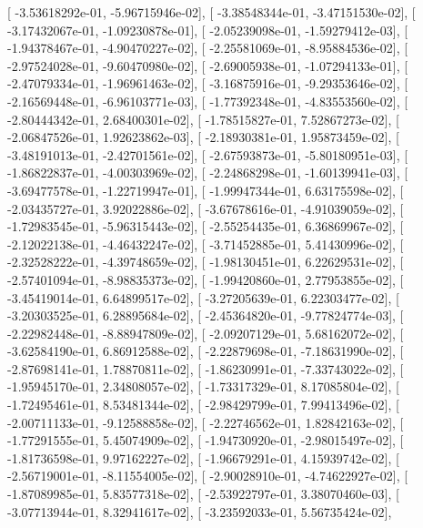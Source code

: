 \documentclass{article}
\begin{document}
       [ -3.53618292e-01,  -5.96715946e-02],
       [ -3.38548344e-01,  -3.47151530e-02],
       [ -3.17432067e-01,  -1.09230878e-01],
       [ -2.05239098e-01,  -1.59279412e-03],
       [ -1.94378467e-01,  -4.90470227e-02],
       [ -2.25581069e-01,  -8.95884536e-02],
       [ -2.97524028e-01,  -9.60470980e-02],
       [ -2.69005938e-01,  -1.07294133e-01],
       [ -2.47079334e-01,  -1.96961463e-02],
       [ -3.16875916e-01,  -9.29353646e-02],
       [ -2.16569448e-01,  -6.96103771e-03],
       [ -1.77392348e-01,  -4.83553560e-02],
       [ -2.80444342e-01,   2.68400301e-02],
       [ -1.78515827e-01,   7.52867273e-02],
       [ -2.06847526e-01,   1.92623862e-03],
       [ -2.18930381e-01,   1.95873459e-02],
       [ -3.48191013e-01,  -2.42701561e-02],
       [ -2.67593873e-01,  -5.80180951e-03],
       [ -1.86822837e-01,  -4.00303969e-02],
       [ -2.24868298e-01,  -1.60139941e-03],
       [ -3.69477578e-01,  -1.22719947e-01],
       [ -1.99947344e-01,   6.63175598e-02],
       [ -2.03435727e-01,   3.92022886e-02],
       [ -3.67678616e-01,  -4.91039059e-02],
       [ -1.72983545e-01,  -5.96315443e-02],
       [ -2.55254435e-01,   6.36869967e-02],
       [ -2.12022138e-01,  -4.46432247e-02],
       [ -3.71452885e-01,   5.41430996e-02],
       [ -2.32528222e-01,  -4.39748659e-02],
       [ -1.98130451e-01,   6.22629531e-02],
       [ -2.57401094e-01,  -8.98835373e-02],
       [ -1.99420860e-01,   2.77953855e-02],
       [ -3.45419014e-01,   6.64899517e-02],
       [ -3.27205639e-01,   6.22303477e-02],
       [ -3.20303525e-01,   6.28895684e-02],
       [ -2.45364820e-01,  -9.77824774e-03],
       [ -2.22982448e-01,  -8.88947809e-02],
       [ -2.09207129e-01,   5.68162072e-02],
       [ -3.62584190e-01,   6.86912588e-02],
       [ -2.22879698e-01,  -7.18631990e-02],
       [ -2.87698141e-01,   1.78870811e-02],
       [ -1.86230991e-01,  -7.33743022e-02],
       [ -1.95945170e-01,   2.34808057e-02],
       [ -1.73317329e-01,   8.17085804e-02],
       [ -1.72495461e-01,   8.53481344e-02],
       [ -2.98429799e-01,   7.99413496e-02],
       [ -2.00711133e-01,  -9.12588858e-02],
       [ -2.22746562e-01,   1.82842163e-02],
       [ -1.77291555e-01,   5.45074909e-02],
       [ -1.94730920e-01,  -2.98015497e-02],
       [ -1.81736598e-01,   9.97162227e-02],
       [ -1.96679291e-01,   4.15939742e-02],
       [ -2.56719001e-01,  -8.11554005e-02],
       [ -2.90028910e-01,  -4.74622927e-02],
       [ -1.87089985e-01,   5.83577318e-02],
       [ -2.53922797e-01,   3.38070460e-03],
       [ -3.07713944e-01,   8.32941617e-02],
       [ -3.23592033e-01,   5.56735424e-02],
\end{document}
